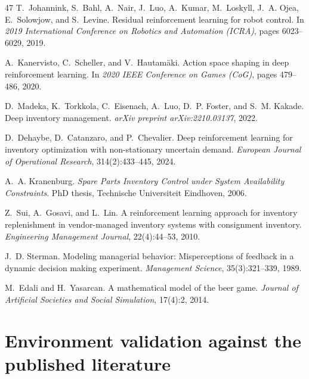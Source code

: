 \documentclass[11pt]{article}
\begin{document}
\begin{thebibliography}{47}
T.~Johannink, S.~Bahl, A.~Nair, J.~Luo, A.~Kumar, M.~Loskyll, J.~A. Ojea, E.~Solowjow, and S.~Levine.
Residual reinforcement learning for robot control.
In \emph{2019 International Conference on Robotics and Automation (ICRA)}, pages 6023--6029, 2019.

A.~Kanervisto, C.~Scheller, and V.~Hautam\"aki.
Action space shaping in deep reinforcement learning.
In \emph{2020 IEEE Conference on Games (CoG)}, pages 479--486, 2020.

D.~Madeka, K.~Torkkola, C.~Eisenach, A.~Luo, D.~P. Foster, and S.~M. Kakade.
Deep inventory management.
\emph{arXiv preprint arXiv:2210.03137}, 2022.

D.~Dehaybe, D.~Catanzaro, and P.~Chevalier.
Deep reinforcement learning for inventory optimization with non-stationary uncertain demand.
\emph{European Journal of Operational Research}, 314(2):433--445, 2024.

A.~A. Kranenburg.
\emph{Spare Parts Inventory Control under System Availability Constraints}.
PhD thesis, Technische Universiteit Eindhoven, 2006.

Z.~Sui, A.~Gosavi, and L.~Lin.
A reinforcement learning approach for inventory replenishment in vendor-managed inventory systems with consignment inventory.
\emph{Engineering Management Journal}, 22(4):44--53, 2010.

J.~D. Sterman.
Modeling managerial behavior: Misperceptions of feedback in a dynamic decision making experiment.
\emph{Management Science}, 35(3):321--339, 1989.

M.~Edali and H.~Yasarcan.
A mathematical model of the beer game.
\emph{Journal of Artificial Societies and Social Simulation}, 17(4):2, 2014.

\end{thebibliography}

\clearpage
\appendix

\section{Environment validation against the published literature}
\label{app:validation}
\end{document}
